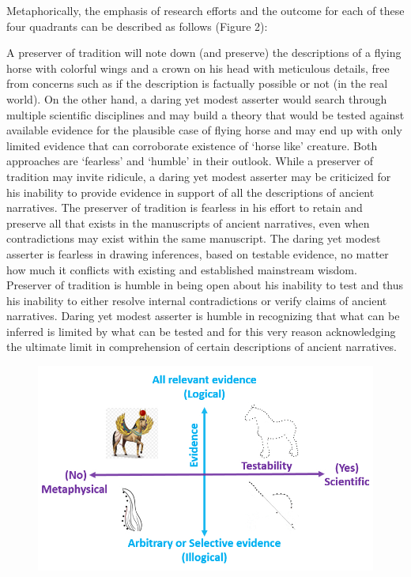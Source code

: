 Metaphorically, the emphasis of research efforts and the outcome for each of these four quadrants can be described as follows (Figure 2):

A preserver of tradition will note down (and preserve) the descriptions of a flying horse with colorful wings and a crown on his head with meticulous details, free from concerns such as if the description is factually possible or not (in the real world). On the other hand, a daring yet modest asserter would search through multiple scientific disciplines and may build a theory that would be tested against available evidence for the plausible case of flying horse and may end up with only limited evidence that can corroborate existence of ‘horse like’ creature. Both approaches are ‘fearless’ and ‘humble’ in their outlook. While a preserver of tradition may invite ridicule, a daring yet modest asserter may be criticized for his inability to provide evidence in support of all the descriptions of ancient narratives. The preserver of tradition is fearless in his effort to retain and preserve all that exists in the manuscripts of ancient narratives, even when contradictions may exist within the same manuscript. The daring yet modest asserter is fearless in drawing inferences, based on testable evidence, no matter how much it conflicts with existing and established mainstream wisdom. Preserver of tradition is humble in being open about his inability to test and thus his inability to either resolve internal contradictions or verify claims of ancient narratives. Daring yet modest asserter is humble in recognizing that what can be inferred is limited by what can be tested and for this very reason acknowledging the ultimate limit in comprehension of certain descriptions of ancient narratives.

\setcounter{figure}{1}

\begin{figure}[!h]
\includegraphics[scale=.3]{images/chap2-3.jpg}
\caption{}\label{chap1-fig2}
\end{figure}

